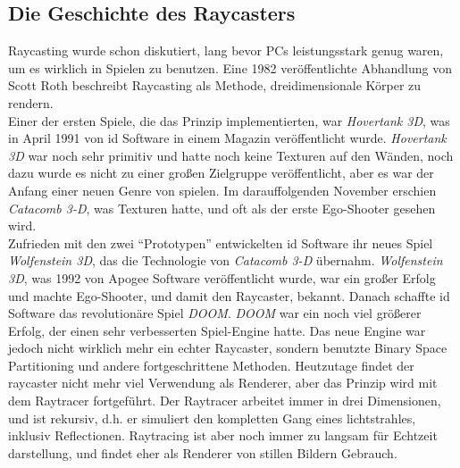 \documentclass[a4paper,11pt]{report}
\begin{document}
\subsection{Die Geschichte des Raycasters}
Raycasting wurde schon diskutiert, lang bevor PCs leistungsstark genug waren, um es wirklich in Spielen zu benutzen. Eine 1982 veröffentlichte Abhandlung von Scott Roth beschreibt Raycasting als Methode, dreidimensionale Körper zu rendern. \\
Einer der ersten Spiele, die das Prinzip implementierten, war \textit{Hovertank 3D}, was in April 1991 von id Software in einem Magazin veröffentlicht wurde. \textit{Hovertank 3D} war noch sehr primitiv und hatte noch keine Texturen auf den Wänden, noch dazu wurde es nicht zu einer großen Zielgruppe veröffentlicht, aber es war der Anfang einer neuen Genre von spielen. Im darauffolgenden November erschien \textit{Catacomb 3-D}, was Texturen hatte, und oft als der erste Ego-Shooter gesehen wird. \\
Zufrieden mit den zwei ``Prototypen'' entwickelten id Software ihr neues Spiel \textit{Wolfenstein 3D}, das die Technologie von \textit{Catacomb 3-D} übernahm. \textit{Wolfenstein 3D}, was 1992 von Apogee Software veröffentlicht wurde, war ein großer Erfolg und machte Ego-Shooter, und damit den Raycaster, bekannt. Danach schaffte id Software das revolutionäre Spiel \textit{DOOM}. \textit{DOOM} war ein noch viel größerer Erfolg, der einen sehr verbesserten Spiel-Engine hatte. Das neue Engine war jedoch nicht wirklich mehr ein echter Raycaster, sondern benutzte Binary Space Partitioning und andere fortgeschrittene Methoden. Heutzutage findet der raycaster nicht mehr viel Verwendung als Renderer, aber das Prinzip wird mit dem Raytracer fortgeführt. Der Raytracer arbeitet immer in drei Dimensionen, und ist rekursiv, d.h. er simuliert den kompletten Gang eines lichtstrahles, inklusiv Reflectionen. Raytracing ist aber noch immer zu langsam für Echtzeit darstellung, und findet eher als Renderer von stillen Bildern Gebrauch.
\end{document}
